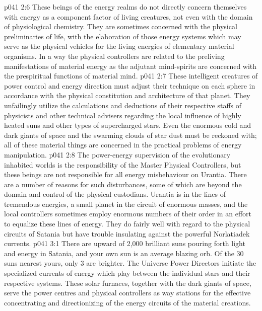 \vs p041 2:6 \pc These beings of the energy realms do not directly concern themselves with energy as a component factor of living creatures, not even with the domain of physiological chemistry. They are sometimes concerned with the physical preliminaries of life, with the elaboration of those energy systems which may serve as the physical vehicles for the living energies of elementary material organisms. In a way the physical controllers are related to the preliving manifestations of material energy as the adjutant mind\hyp{}spirits are concerned with the prespiritual functions of material mind.
\vs p041 2:7 \pc These intelligent creatures of power control and energy direction must adjust their technique on each sphere in accordance with the physical constitution and architecture of that planet. They unfailingly utilize the calculations and deductions of their respective staffs of physicists and other technical advisers regarding the local influence of highly heated suns and other types of supercharged stars. Even the enormous cold and dark giants of space and the swarming clouds of star dust must be reckoned with; all of these material things are concerned in the practical problems of energy manipulation.
\vs p041 2:8 The power\hyp{}energy supervision of the evolutionary inhabited worlds is the responsibility of the Master Physical Controllers, but these beings are not responsible for all energy misbehaviour on Urantia. There are a number of reasons for such disturbances, some of which are beyond the domain and control of the physical custodians. Urantia is in the lines of tremendous energies, a small planet in the circuit of enormous masses, and the local controllers sometimes employ enormous numbers of their order in an effort to equalize these lines of energy. They do fairly well with regard to the physical circuits of Satania but have trouble insulating against the powerful Norlatiadek currents.
\vs p041 3:1 There are upward of 2,000 brilliant suns pouring forth light and energy in Satania, and your own sun is an average blazing orb. Of the 30 suns nearest yours, only 3 are brighter. The Universe Power Directors initiate the specialized currents of energy which play between the individual stars and their respective systems. These solar furnaces, together with the dark giants of space, serve the power centres and physical controllers as way stations for the effective concentrating and directionizing of the energy circuits of the material creations.
